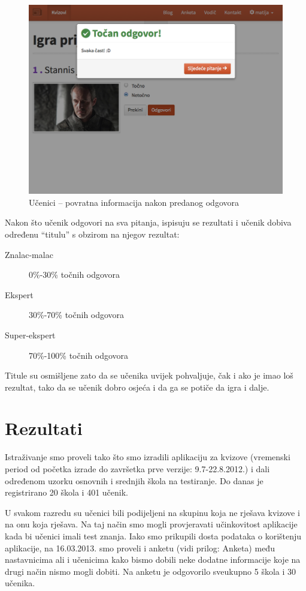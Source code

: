 \documentclass{scrreprt}
\begin{document}
\begin{figure}[H]
  \includegraphics[width=\textwidth, clip=true, trim=0 7cm 0 0, fbox]{student/boolean_question_correct}
  \caption{Učenici -- povratna informacija nakon predanog odgovora}
\end{figure}

Nakon što učenik odgovori na sva pitanja, ispisuju se rezultati i učenik dobiva
određenu ``titulu'' s obzirom na njegov rezultat:

\begin{description}
  \item[Znalac-malac] 0\%-30\% točnih odgovora
  \item[Ekspert] 30\%-70\% točnih odgovora
  \item[Super-ekspert] 70\%-100\% točnih odgovora
\end{description}

Titule su osmišljene zato da se učenika uvijek pohvaljuje, čak i ako je imao loš
rezultat, tako da se učenik dobro osjeća i da ga se potiče da igra i dalje.

\chapter{Rezultati}
\label{chap:results}

Istraživanje smo proveli tako što smo izradili aplikaciju za kvizove (vremenski
period od početka izrade do završetka prve verzije: 9.7-22.8.2012.) i dali
određenom uzorku osnovnih i srednjih škola na testiranje. Do danas je
registrirano 20 škola i 401 učenik.

U svakom razredu su učenici bili podijeljeni na skupinu koja ne rješava kvizove
i na onu koja rješava. Na taj način smo mogli provjeravati učinkovitost
aplikacije kada bi učenici imali test znanja. Iako smo prikupili dosta podataka
o korištenju aplikacije, na 16.03.2013. smo proveli i anketu (vidi prilog:
Anketa) među nastavnicima ali i učenicima kako bismo dobili neke dodatne
informacije koje na drugi način nismo mogli dobiti. Na anketu je odgovorilo
sveukupno 5 škola i 30 učenika.
\end{document}
